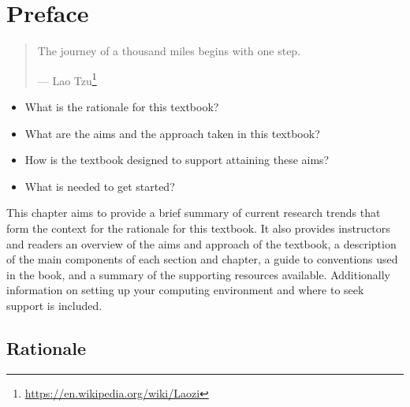 \documentclass[
  letterpaper,
]{scrbook}
\providecommand{\tightlist}{%
  \setlength{\itemsep}{0pt}\setlength{\parskip}{0pt}}\usepackage{longtable,booktabs,array}
\DeclareRobustCommand{\href}[2]{#2\footnote{\url{#1}}}
\begin{document}

\hypertarget{sec-preface}{%
\chapter*{Preface}\label{sec-preface}}


\begin{quote}
The journey of a thousand miles begins with one step.

--- \href{https://en.wikipedia.org/wiki/Laozi}{Lao Tzu}
\end{quote}

\begin{tcolorbox}[enhanced jigsaw, title=\textcolor{quarto-callout-note-color}{\faInfo}\hspace{0.5em}{Keys}, titlerule=0mm, toptitle=1mm, colbacktitle=quarto-callout-note-color!10!white, bottomtitle=1mm, left=2mm, colframe=quarto-callout-note-color-frame, breakable, toprule=.15mm, colback=white, opacitybacktitle=0.6, leftrule=.75mm, rightrule=.15mm, bottomrule=.15mm, arc=.35mm, coltitle=black, opacityback=0]

\begin{itemize}
\tightlist
\item
  What is the rationale for this textbook?
\item
  What are the aims and the approach taken in this textbook?
\item
  How is the textbook designed to support attaining these aims?
\item
  What is needed to get started?
\end{itemize}

\end{tcolorbox}

This chapter aims to provide a brief summary of current research trends
that form the context for the rationale for this textbook. It also
provides instructors and readers an overview of the aims and approach of
the textbook, a description of the main components of each section and
chapter, a guide to conventions used in the book, and a summary of the
supporting resources available. Additionally information on setting up
your computing environment and where to seek support is included.

\hypertarget{rationale}{%
\section*{Rationale}\label{rationale}}
\end{document}
